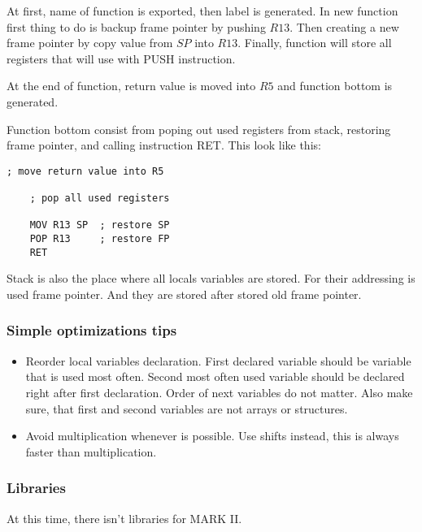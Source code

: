 At first, name of function is exported, then label is generated. In new function
first thing to do is backup frame pointer by pushing $R13$. Then creating a new
frame pointer by copy value from $SP$ into $R13$. Finally, function will store all
registers that will use with PUSH instruction.

At the end of function, return value is moved into $R5$ and function bottom is
generated.

Function bottom consist from poping out used registers from stack, restoring frame pointer,
and calling instruction RET. This look like this:

\begin{lstlisting}[language={[markII]Assembler}, frame=single]
    ; move return value into R5

    ; pop all used registers

    MOV R13 SP  ; restore SP
    POP R13     ; restore FP
    RET
\end{lstlisting}

Stack is also the place where all locals variables are stored. For their addressing
is used frame pointer. And they are stored after stored old frame pointer.

\subsubsection{Simple optimizations tips}

\begin{itemize}

    \item
    Reorder local variables declaration. First declared variable should be
    variable that is used most often. Second most often used variable should be
    declared right after first declaration. Order of next variables do not
    matter. Also make sure, that first and second variables are not arrays or
    structures.

    \item
    Avoid multiplication whenever is possible. Use shifts instead, this is
    always faster than multiplication.

\end{itemize}

\subsubsection{Libraries}

At this time, there isn't libraries for MARK II.
